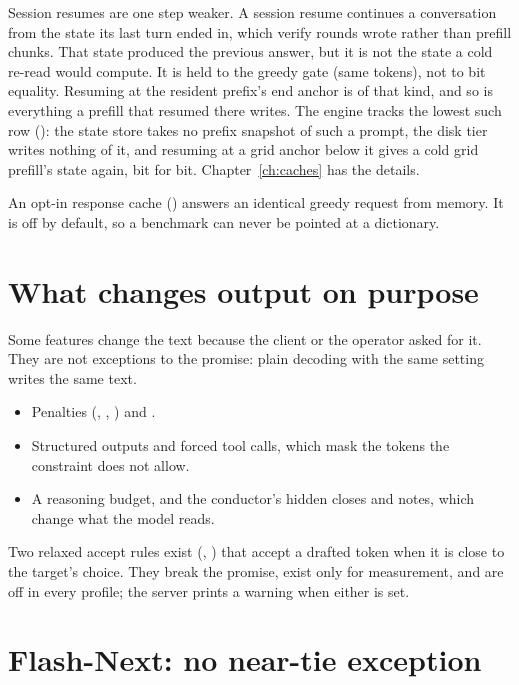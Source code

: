 Session resumes are one step weaker. A session resume continues a conversation from the state its last turn ended in, which verify rounds wrote rather than prefill chunks. That state produced the previous answer, but it is not the state a cold re-read would compute. It is held to the greedy gate (same tokens), not to bit equality. Resuming at the resident prefix's end anchor is of that kind, and so is everything a prefill that resumed there writes. The engine tracks the lowest such row (): the state store takes no prefix snapshot of such a prompt, the disk tier writes nothing of it, and resuming at a grid anchor below it gives a cold grid prefill's state again, bit for bit. Chapter~\ref{ch:caches} has the details.

An opt-in response cache () answers an identical greedy request from memory. It is off by default, so a benchmark can never be pointed at a dictionary.

\section{What changes output on purpose}

Some features change the text because the client or the operator asked for it. They are not exceptions to the promise: plain decoding with the same setting writes the same text.

\begin{itemize}
\item Penalties (, , ) and .
\item Structured outputs and forced tool calls, which mask the tokens the constraint does not allow.
\item A reasoning budget, and the conductor's hidden closes and notes, which change what the model reads.
\end{itemize}

Two relaxed accept rules exist (, ) that accept a drafted token when it is close to the target's choice. They break the promise, exist only for measurement, and are off in every profile; the server prints a warning when either is set.

\section{Flash-Next: no near-tie exception}

